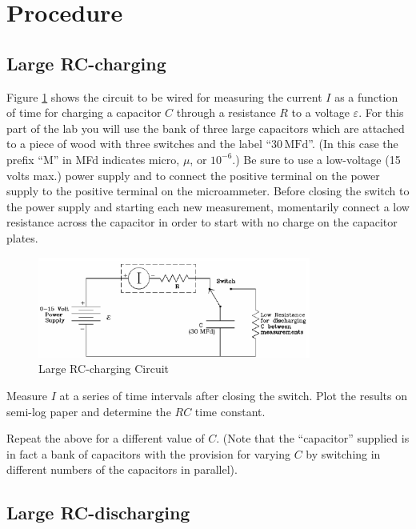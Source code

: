 \section{Procedure}

\subsection{Large RC-charging}

Figure \ref{fig:largerccharge} shows the circuit to be wired for measuring the current $I$ as a function of time for charging a capacitor $C$ through a resistance $R$ to a voltage $\varepsilon$. For this part of the lab you will use the bank of three large capacitors which are attached to a piece of wood with three switches and the label ``$30\,\mathrm{MFd}$''. (In this case the prefix ``M'' in MFd indicates micro, $\mu$, or $10^{-6}$.) Be sure to use a low-voltage (15 volts max.) power supply and to connect the positive terminal on the power supply to the positive terminal on the microammeter. Before closing the switch to the power supply and starting each new measurement, momentarily connect a low resistance across the capacitor in order to start with no charge on the capacitor plates.\myskip
\begin{figure}[h]
    \begin{center}
        \includegraphics[width=0.8\textwidth]{./Exp4/pic/image6.png}
    \end{center}
    \caption{Large RC-charging Circuit}
    \label{fig:largerccharge}
\end{figure}

Measure $I$ at a series of time intervals after closing the switch. Plot the results on semi-log paper and determine the $RC$ time constant.\myskip

Repeat the above for a different value of $C$. (Note that the ``capacitor'' supplied is in fact a bank of capacitors with the provision for varying $C$ by switching in different numbers of the capacitors in parallel).

\subsection{Large RC-discharging}

